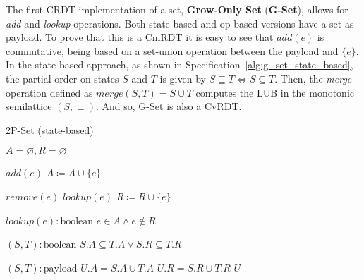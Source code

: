 The first CRDT implementation of a set, \textbf{Grow-Only Set} (\textbf{G-Set}),
allows for \textit{add} and \textit{lookup} operations. Both state-based and
op-based versions have a set as payload. To prove that this is a CmRDT it is
easy to see that $\textit{add}(e)$ is commutative, being based on a set-union
operation between the payload and $\{e\}$. In the state-based approach, as shown in
Specification~\ref{alg:g_set_state_based}, the partial order on states $S$ and
$T$ is given by $S \sqsubseteq T \iff S \subseteq T$. Then, the \textit{merge}
operation defined as $\textit{merge}(S,T) = S \cup T$ computes the LUB in the
monotonic semilattice $(S, \sqsubseteq)$. And so, G-Set is also a CvRDT.

\begin{algorithm}[t]
\small{
	\caption{2P-Set (state-based)}
 	\label{alg:2p_set_state_based}                       

 	\begin{algorithmic}[1]
 	  \State \Payload $A = \varnothing, R = \varnothing$
 	  
 	  \State \Update $add(e)$
 	  \State \hspace{\algorithmicindent} $A \coloneqq A \cup \{e\}$
 	  
 	  \State \Update $remove(e)$
 	  \State \hspace{\algorithmicindent} \Pre $lookup(e)$
 	  \State \hspace{\algorithmicindent} $R \coloneqq R \cup \{e\}$
 	  
 	  \State \Query $lookup(e) : \text{boolean}$
 	  \State \hspace{\algorithmicindent} \Return $e \in A \land e \not\in R$
 	  
 	  \State \Compare $(S, T) : \text{boolean}$
 	  \State \hspace{\algorithmicindent} \Return $S.A \subseteq T.A \lor S.R \subseteq T.R$ 
 	  
 	  \State \Merge $(S, T) : \text{payload}$
 	  \State \hspace{\algorithmicindent} \Let $U.A = S.A \cup T.A$
 	  \State \hspace{\algorithmicindent} \Let $U.R = S.R \cup T.R$
 	  \State \hspace{\algorithmicindent} \Return $U$
	\end{algorithmic}
 }
\end{algorithm}

